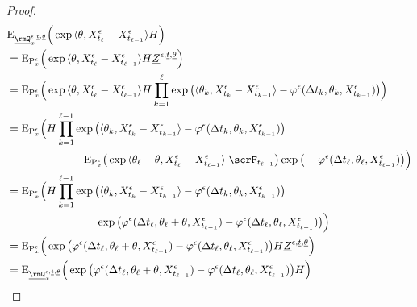 \begin{proof}
  \begin{align*}
    &\Exp_{\fddPrb^{\epsilon, \underline t, \underline\twistVar}_\stateVar}\Big( \exp\prj{\twistVar}{\Xee_{t_\ell}-\Xee_{t_{\ell-1}}} H \Big) \\
    &=\Exp_{\Prb^\epsilon_\stateVar}\Big( \exp\prj{\twistVar}{\Xee_{t_\ell}-\Xee_{t_{\ell-1}}} H \fddDensity^{\epsilon,\underline t,\underline\twistVar} \Big)  \\
    &=\Exp_{\Prb^\epsilon_\stateVar}\Big( \exp\prj{\twistVar}{\Xee_{t_\ell}-\Xee_{t_{\ell-1}}} H \prod_{k=1}^\ell \exp\big(\prj{\twistVar_k}{\Xee_{t_k}-\Xee_{t_{k-1}}} - \affShift^\epsilon(\Delta t_k, \twistVar_k, \Xee_{t_{k-1}})\big) \Big)  \\
    &=\Exp_{\Prb^\epsilon_\stateVar}\Big( \begin{aligned}[t]
      &H  \prod_{k=1}^{\ell-1} \exp\big(\prj{\twistVar_k}{\Xee_{t_k}-\Xee_{t_{k-1}}} - \affShift^\epsilon(\Delta t_k, \twistVar_k, \Xee_{t_{k-1}})\big) \\
      &\hspace{12mm} \Exp_{\Prb^\epsilon_\stateVar}\big(\exp\prj{\twistVar_\ell + \twistVar}{\Xee_{t_\ell}-\Xee_{t_{\ell-1}}}|\scrF_{t_{\ell-1}}\big) \exp\big(-\affShift^\epsilon(\Delta t_\ell, \twistVar_\ell, \Xee_{t_{\ell-1}})\big) \Big)
    \end{aligned} \\
    &=\Exp_{\Prb^\epsilon_\stateVar}\Big( \begin{aligned}[t]
      &H  \prod_{k=1}^{\ell-1} \exp\big(\prj{\twistVar_k}{\Xee_{t_k}-\Xee_{t_{k-1}}} - \affShift^\epsilon(\Delta t_k, \twistVar_k, \Xee_{t_{k-1}})\big) \\
      &\hspace{16mm} \exp\big(\affShift^\epsilon(\Delta t_\ell, \twistVar_\ell + \twistVar, \Xee_{t_{\ell-1}})-\affShift^\epsilon(\Delta t_\ell, \twistVar_\ell, \Xee_{t_{\ell-1}})\big) \Big)
    \end{aligned} \\
    &=\Exp_{\Prb^\epsilon_\stateVar}\Big( \exp\big(\affShift^\epsilon(\Delta t_\ell, \twistVar_\ell + \twistVar, \Xee_{t_{\ell-1}})-\affShift^\epsilon(\Delta t_\ell, \twistVar_\ell, \Xee_{t_{\ell-1}})\big) H \fddDensity^{\epsilon,\underline t,\underline\twistVar} \Big) \\
    &=\Exp_{\fddPrb^{\epsilon, \underline t, \underline\twistVar}_\stateVar}\Big( \exp\big(\affShift^\epsilon(\Delta t_\ell, \twistVar_\ell + \twistVar, \Xee_{t_{\ell-1}})-\affShift^\epsilon(\Delta t_\ell, \twistVar_\ell, \Xee_{t_{\ell-1}})\big) H \Big) 

\end{align*}
\end{proof}
